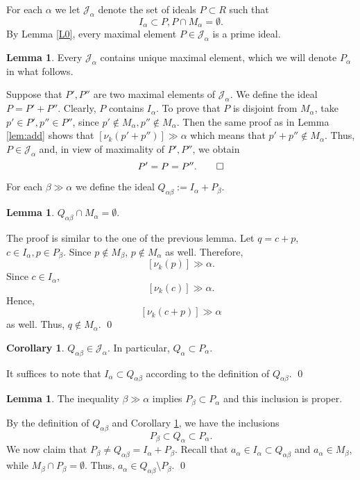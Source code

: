 \documentclass{amsproc}
\theoremstyle{definition}
\newtheorem{lemma}[theorem]{Lemma}
\theoremstyle{definition}
\newtheorem{corollary}[theorem]{Corollary}
\theoremstyle{remark}
\begin{document}
 For each ${\alpha}$ we let 
${\mathcal J}_{\alpha}$ denote the set of ideals $P\subset R$ such that 
$$
I_{\alpha}\subset P, P\cap  M_{\alpha}=\emptyset.$$ 
By Lemma \ref{L0}, every maximal element $P\in {\mathcal J}_{\alpha}$ is a prime ideal. 

\begin{lemma}\label{lem:max}
Every ${\mathcal J}_{\alpha}$ contains unique maximal element, which we will denote $P_{\alpha}$ in what follows. 
\end{lemma}
{\par\medskip{}} Suppose that $P', P''$ are two  maximal elements of  ${\mathcal J}_{\alpha}$. We define the ideal 
$P=P' + P''$. Clearly, $P$ contains $I_{\alpha}$. To prove that $P$ is disjoint from $M_{\alpha}$, take  
 $p'\in P', p''\in P''$, since $p'\notin M_{\alpha}, p''\notin M_{\alpha}$. Then the same proof as in Lemma \ref{lem:add} shows that 
 $[\nu_k(p'+ p'') ]\gg {\alpha}$ which means that $p'+p''\notin M_{\alpha}$. 
 Thus, $P\in {\mathcal J}_{\alpha}$ and, in view of maximality of $P', P''$, we obtain
$$
P'= P= P''. \qed 
$$

For each ${\beta} \gg {\alpha}$ we define the ideal $Q_{{\alpha}{\beta}}:=I_{\alpha}+ P_{\beta}$. 

\begin{lemma}\label{L1}
$Q_{{\alpha}{\beta}} \cap M_{\alpha}=\emptyset$. 
\end{lemma}
{\par\medskip{}} The proof is similar to the one of the previous lemma. 
Let $q=c+p$, $c\in I_{\alpha}, p\in P_{\beta}$. Since $p\notin M_{\beta}$, $p\notin M_{\alpha}$ as well. Therefore, 
$$
[\nu_{k}(p)] \gg {\alpha}.   
$$ 
Since $c\in I_{\alpha}$, 
$$
[\nu_{k}(c)] \gg {\alpha}. 
$$
Hence, 
$$
[\nu_{k}(c+p)] \gg {\alpha} 
$$
as well. Thus, $q\notin M_{\alpha}$. \qed 

\begin{corollary}\label{cor:C}
$Q_{{\alpha}{\beta}}\in {\mathcal J}_{\alpha}$. In particular, $Q_{\alpha}\subset P_{\alpha}$. 
\end{corollary}
{\par\medskip{}} It suffices to note that $I_{\alpha}\subset Q_{{\alpha}{\beta}}$ according to the definition of $Q_{{\alpha}{\beta}}$. \qed 

\begin{lemma}\label{L2}
The inequality ${\beta} \gg {\alpha}$ implies $P_{\beta}\subset P_{\alpha}$ and this inclusion is proper. 
\end{lemma}
{\par\medskip{}} By the definition of $Q_{{\alpha}{\beta}}$ and Corollary \ref{cor:C}, we have the inclusions
$$
P_{\beta}\subset Q_{\alpha}\subset P_{\alpha}. 
$$
We now claim that $P_{\beta}\ne Q_{{\alpha}{\beta}}=I_{\alpha}+ P_{\beta}$. Recall that $a_{\alpha}\in I_{\alpha}\subset Q_{{\alpha}{\beta}}$ and 
$a_{\alpha}\in M_{\beta}$, while $M_{\beta}\cap P_{\beta}=\emptyset$. Thus, $a_{\alpha}\in Q_{{\alpha}{\beta}} \setminus P_{\beta}$. \qed  
\end{document}
